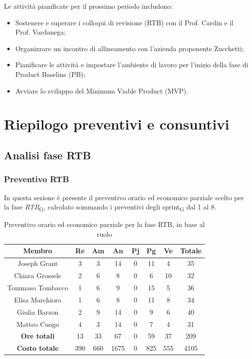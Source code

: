 \documentclass[11pt,a4paper]{article}
\newcommand{\gls}[1]{#1\textsubscript{G}}
\begin{document}
Le attività pianificate per il prossimo periodo includono:
\begin{itemize}
    \item Sostenere e superare i colloqui di revisione (RTB) con il Prof. Cardin e il Prof. Vardanega;
    \item Organizzare un incontro di allineamento con l'azienda proponente Zucchetti;
    \item Pianificare le attività e impostare l'ambiente di lavoro per l'inizio della fase di Product Baseline (PB);
    \item Avviare lo sviluppo del Minimum Viable Product (MVP).
\end{itemize}
\newpage

\section{Riepilogo preventivi e consuntivi}

\subsection{Analisi fase RTB}

\subsubsection{Preventivo RTB}
In questa sezione è presente il preventivo orario ed economico parziale scelto per la fase \textit{RTB}\textsubscript{G}, calcolato sommando i preventivi degli \gls{sprint} dal 1 al 8.

\begin{table}[H]
    \centering
    \begin{tabular}{|c|c|c|c|c|c|c|c|}
        \hline
        \textbf{Membro} & \textbf{Re} & \textbf{Am} & \textbf{An} & \textbf{Pj} & \textbf{Pg} & \textbf{Ve} & \textbf{Totale} \\
        \hline
        Joseph Grant & 3 & 3 & 14 & 0 & 11 & 4 & 35 \\
        Chiara Grossele & 2 & 6 & 8 & 0 & 6 & 10 & 32 \\
        Tommaso Tombacco & 1 & 6 & 9 & 0 & 15 & 5 & 36 \\
        Elisa Marchioro & 1 & 6 & 8 & 0 & 11 & 8 & 34 \\
        Giulia Barzon & 2 & 9 & 14 & 0 & 9 & 6 & 40 \\
        Matteo Cuogo & 4 & 3 & 14 & 0 & 7 & 4 & 31 \\
        \hline
        \textbf{Ore totali} & 13 & 33 & 67 & 0 & 59 & 37 & 209 \\
        \hline
        \textbf{Costo totale} & 390 & 660 & 1675 & 0 & 825 & 555 & 4105 \\
        \hline
    \end{tabular}
    \caption{Preventivo orario ed economico parziale per la fase RTB, in base al ruolo}
\end{table}
\end{document}
